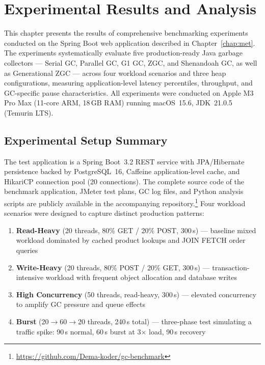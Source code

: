 \chapter{Experimental Results and Analysis}
\label{chap:impl}

This chapter presents the results of comprehensive benchmarking experiments conducted on the Spring Boot web application described in Chapter~\ref{chap:met}. The experiments systematically evaluate five production-ready Java garbage collectors --- Serial GC, Parallel GC, G1 GC, ZGC, and Shenandoah GC, as well as Generational ZGC --- across four workload scenarios and three heap configurations, measuring application-level latency percentiles, throughput, and GC-specific pause characteristics. All experiments were conducted on Apple M3 Pro Max (11-core ARM, 18\,GB RAM) running macOS~15.6, JDK~21.0.5 (Temurin LTS).

\section{Experimental Setup Summary}
\label{sec:setup-summary}

The test application is a Spring Boot~3.2 REST service with JPA/Hibernate persistence backed by PostgreSQL~16, Caffeine application-level cache, and HikariCP connection pool (20 connections). The complete source code of the benchmark application, JMeter test plans, GC log files, and Python analysis scripts are publicly available in the accompanying  repository.\footnote{\url{https://github.com/Dema-koder/gc-benchmark}} Four workload scenarios were designed to capture distinct production patterns:

\begin{enumerate}
    \item \textbf{Read-Heavy} (20 threads, 80\% GET / 20\% POST, 300\,s) --- baseline mixed workload dominated by cached product lookups and JOIN FETCH order queries
    \item \textbf{Write-Heavy} (20 threads, 80\% POST / 20\% GET, 300\,s) --- transaction-intensive workload with frequent object allocation and database writes
    \item \textbf{High Concurrency} (50 threads, read-heavy, 300\,s) --- elevated concurrency to amplify GC pressure and queue effects
    \item \textbf{Burst} (20$\to$60$\to$20 threads, 240\,s total) --- three-phase test simulating a traffic spike: 90\,s normal, 60\,s burst at 3$\times$ load, 90\,s recovery
\end{enumerate}

